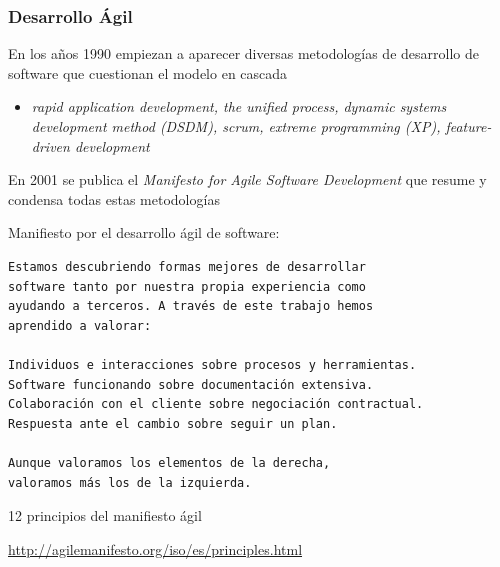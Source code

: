 \documentclass[ucs]{beamer}
\begin{document}
\begin{frame}[fragile]
\frametitle{Desarrollo Ágil}

En los años 1990 empiezan a aparecer diversas metodologías de
desarrollo de software que cuestionan el modelo en cascada


\begin{itemize}
\item
\emph{rapid application development,
the unified process,
dynamic systems development method (DSDM),
scrum,
extreme programming (XP),
feature-driven development}
\end{itemize}


En 2001 se publica el
\emph{Manifesto for Agile Software Development}
que resume y condensa todas estas metodologías


\end{frame}
\begin{frame}[fragile]

Manifiesto por el desarrollo ágil de software:
  \begin{scriptsize}
  \begin{verbatim}
Estamos descubriendo formas mejores de desarrollar
software tanto por nuestra propia experiencia como
ayudando a terceros. A través de este trabajo hemos
aprendido a valorar:

Individuos e interacciones sobre procesos y herramientas.
Software funcionando sobre documentación extensiva.
Colaboración con el cliente sobre negociación contractual.
Respuesta ante el cambio sobre seguir un plan.

Aunque valoramos los elementos de la derecha,
valoramos más los de la izquierda.
  \end{verbatim}
  \end{scriptsize}

12 principios del manifiesto ágil

\url{http://agilemanifesto.org/iso/es/principles.html}
\end{frame}
\end{document}
